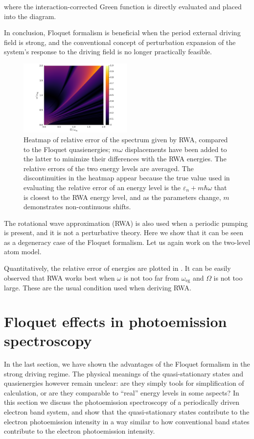 \documentclass[hyperref, a4paper]{article}
\newcommand*{\omegaeg}{\omega_{\text{eg}}}
\begin{document}
where the interaction-corrected Green function is directly evaluated 
and placed into the diagram.

In conclusion, Floquet formalism is beneficial when the period external driving field is strong, 
and the conventional concept of perturbation expansion 
of the system's response to the driving field 
is no longer practically feasible.

\begin{figure}
    \centering
    \includegraphics[width=0.5\textwidth]{plot/relative-error-rwa.pdf}
    \caption{Heatmap of relative error of the spectrum given by RWA, 
    compared to the Floquet quasienergies; 
    $m \omega$ displacements have been added to the latter 
    to minimize their differences with the RWA energies.
    The relative errors of the two energy levels are averaged.
    The discontinuities in the heatmap appear because the true value used in 
    evaluating the relative error of an energy level  
    is the $\varepsilon_n + m \hbar \omega$ 
    that is closest to the RWA energy level, 
    and as the parameters change, $m$ demonstrates non-continuous shifts.}
    \label{fig:rwa-floquet}
\end{figure}

The rotational wave approximation (RWA) is also used 
when a periodic pumping is present, 
and it is not a perturbative theory.
Here we show that it can be seen as a degeneracy case of the Floquet formalism.
Let us again work on the two-level atom model.

Quantitatively, the relative error of energies are plotted in .
It can be easily observed that RWA works best when $\omega$ is not too far from $\omegaeg$ and $\Omega$ is not too large.
These are the usual condition used when deriving RWA.

\section{Floquet effects in photoemission spectroscopy}

In the last section, we have shown the advantages of the Floquet formalism 
in the strong driving regime.
The physical meanings of the quasi-stationary states and quasienergies however remain unclear:
are they simply tools for simplification of calculation, 
or are they comparable to ``real'' energy levels in some aspects?
In this section we discuss the photoemission spectroscopy of a periodically driven electron band system, 
and show that the quasi-stationary states contribute to the 
electron photoemission intensity in a way similar to 
how conventional band states contribute to the electron photoemission intensity.
\end{document}
